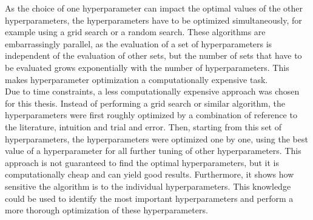 As the choice of one hyperparameter can impact the optimal values of the other hyperparameters, the hyperparameters have to be optimized simultaneously, for example using a grid search or a random search. These algorithms are embarrassingly parallel, as the evaluation of a set of hyperparameters is independent of the evaluation of other sets, but the number of sets that have to be evaluated grows exponentially with the number of hyperparameters. This makes hyperparameter optimization a computationally expensive task.
\\
Due to time constraints, a less computationally expensive approach was chosen for this thesis. Instead of performing a grid search or similar algorithm, the hyperparameters were first roughly optimized by a combination of reference to the literature, intuition and trial and error. Then, starting from this set of hyperparameters, the hyperparameters were optimized one by one, using the best value of a hyperparameter for all further tuning of other hyperparameters. This approach is not guaranteed to find the optimal hyperparameters, but it is computationally cheap and can yield good results. Furthermore, it shows how sensitive the algorithm is to the individual hyperparameters. This knowledge could be used to identify the most important hyperparameters and perform a more thorough optimization of these hyperparameters.


